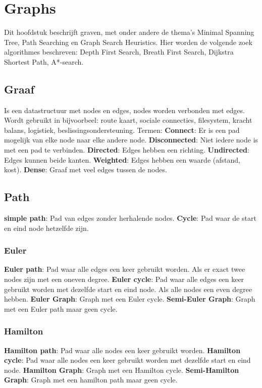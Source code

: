\section{Graphs}
Dit hoofdstuk beschrijft graven, met onder andere de thema's Minimal Spanning Tree, Path Searching en Graph Search Heuristics.
Hier worden de volgende zoek algorithmes beschreven: Depth First Search, Breath First Search, Dijkstra Shortest Path, A*-search.

\subsection{Graaf}
Is een datastructuur met nodes en edges, nodes worden verbonden met edges.
Wordt gebruikt in bijvoorbeel: route kaart, sociale connecties, filesystem, kracht balans, logistiek, beslissingsondersteuning.
Termen:
\textbf{Connect}: Er is een pad mogelijk van elke node naar elke andere node.
\textbf{Disconnected}: Niet iedere node is met een pad te verbinden.
\textbf{Directed}: Edges hebben een richting.
\textbf{Undirected}: Edges kunnen beide kanten.
\textbf{Weighted}: Edges hebben een waarde (afstand, kost).
\textbf{Dense}: Graaf met veel edges tussen de nodes.

\subsection{Path}
\textbf{simple path}: Pad van edges zonder herhalende nodes.
\textbf{Cycle}: Pad waar de start en eind node hetzelfde zijn.

\subsubsection{Euler}
\textbf{Euler path}: Pad waar alle edges een keer gebruikt worden.
Als er exact twee nodes zijn met een oneven degree.
\textbf{Euler cycle}: Pad waar alle edges een keer gebruikt worden met dezelfde start en eind node.
Als alle nodes een even degree hebben.
\textbf{Euler Graph}: Graph met een Euler cycle.
\textbf{Semi-Euler Graph}: Graph met een Euler path maar geen cycle.

\subsubsection{Hamilton}
\textbf{Hamilton path}: Pad waar alle nodes een keer gebruikt worden.
\textbf{Hamilton cycle}: Pad waar alle nodes een keer gebruikt worden met dezelfde start en eind node.
\textbf{Hamilton Graph}: Graph met een Hamilton cycle.
\textbf{Semi-Hamilton Graph}: Graph met een hamilton path maar geen cycle.

